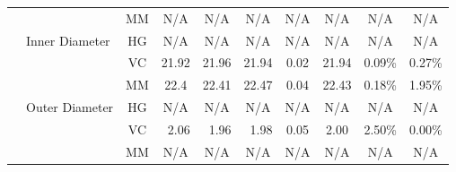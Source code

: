 \begin{table}[h!]
{\begin{tabular}{|l|l|cccc|c|c|c|c|}
			                                  &                                  & \multicolumn{1}{c|}{MM}                & \multicolumn{1}{c|}{\cellcolor[HTML]{FF0000}N/A} & \multicolumn{1}{c|}{\cellcolor[HTML]{FF0000}N/A} & \cellcolor[HTML]{FF0000}N/A & \cellcolor[HTML]{FF0000}N/A & \cellcolor[HTML]{FF0000}N/A & \cellcolor[HTML]{FF0000}N/A & \cellcolor[HTML]{FF0000}N/A \\ \cline{3-10}
			                                  & \multirow{-3}{*}{Inner Diameter} & \multicolumn{1}{c|}{HG}                & \multicolumn{1}{c|}{\cellcolor[HTML]{FF0000}N/A} & \multicolumn{1}{c|}{\cellcolor[HTML]{FF0000}N/A} & \cellcolor[HTML]{FF0000}N/A & \cellcolor[HTML]{FF0000}N/A & \cellcolor[HTML]{FF0000}N/A & \cellcolor[HTML]{FF0000}N/A & \cellcolor[HTML]{FF0000}N/A \\ \cline{2-10}
			                                  &                                  & \multicolumn{1}{c|}{VC}                & \multicolumn{1}{c|}{21.92}                       & \multicolumn{1}{c|}{21.96}                       & 21.94                       & 0.02                        & 21.94                       & 0.09\%                      & 0.27\%                      \\ \cline{3-10}
			                                  &                                  & \multicolumn{1}{c|}{MM}                & \multicolumn{1}{c|}{22.4}                        & \multicolumn{1}{c|}{22.41}                       & 22.47                       & 0.04                        & 22.43                       & 0.18\%                      & 1.95\%                      \\ \cline{3-10}
			                                  & \multirow{-3}{*}{Outer Diameter} & \multicolumn{1}{c|}{HG}                & \multicolumn{1}{c|}{\cellcolor[HTML]{FF0000}N/A} & \multicolumn{1}{c|}{\cellcolor[HTML]{FF0000}N/A} & \cellcolor[HTML]{FF0000}N/A & \cellcolor[HTML]{FF0000}N/A & \cellcolor[HTML]{FF0000}N/A & \cellcolor[HTML]{FF0000}N/A & \cellcolor[HTML]{FF0000}N/A \\ \cline{2-10}
			                                  &                                  & \multicolumn{1}{c|}{VC}                & \multicolumn{1}{r|}{2.06}                        & \multicolumn{1}{r|}{1.96}                        & \multicolumn{1}{r|}{1.98}   & 0.05                        & 2.00                        & 2.50\%                      & 0.00\%                      \\ \cline{3-10}
			                                  &                                  & \multicolumn{1}{c|}{MM}                & \multicolumn{1}{c|}{\cellcolor[HTML]{FF0000}N/A} & \multicolumn{1}{c|}{\cellcolor[HTML]{FF0000}N/A} & \cellcolor[HTML]{FF0000}N/A & \cellcolor[HTML]{FF0000}N/A & \cellcolor[HTML]{FF0000}N/A & \cellcolor[HTML]{FF0000}N/A & \cellcolor[HTML]{FF0000}N/A \\ \cline{3-10}

\end{tabular}}
\end{table}
